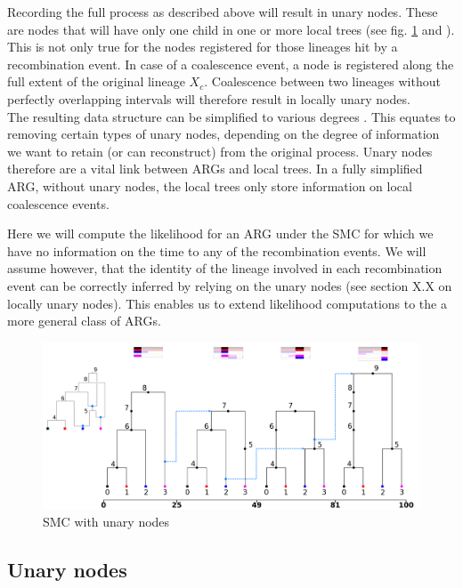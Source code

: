 \documentclass{article}
\begin{document}
Recording the full process as described above will result in unary nodes.
These are nodes that will have only one child in one or more local trees 
(see fig. \ref{fig:smc-unary} and \citet{Wong-2023}). This is not only true 
for the nodes registered for those lineages hit by a recombination event. 
In case of a coalescence event, a node is registered along the full 
extent of the original lineage $X_c$. 
Coalescence between two lineages without perfectly 
overlapping intervals will therefore result in locally unary nodes.\\

The resulting data structure can be simplified to various degrees \citep{Wong-2023}. 
This equates to removing certain types of unary nodes, 
depending on the degree of information 
we want to retain (or can reconstruct) from the original process. 
Unary nodes therefore are a vital link between 
ARGs and local trees. In a fully simplified ARG, without unary nodes, 
the local trees only store information on local coalescence events. 

Here we will compute the likelihood for an ARG
under the SMC for which we have no information on the time to any 
of the recombination events. We will assume however, that the identity 
of the lineage involved in each recombination event can be correctly 
inferred by relying on the unary nodes (see section X.X on locally unary nodes). 
This enables us to extend likelihood computations to the 
a more general class of ARGs.

\begin{figure}[h!] \label{fig:smc-unary}
\centering
\includegraphics[width=\textwidth]{smc-custom-haplotypes-mini.png}
\caption{SMC with unary nodes}
\end{figure}

\subsection{Unary nodes} \label{par:unary}
\end{document}
